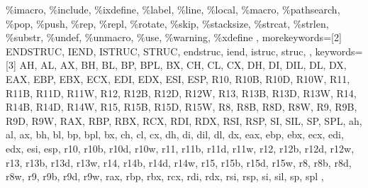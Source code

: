 {{\%imacro, \%include, \%ixdefine, \%label, \%line, \%local, \%macro,
\%pathsearch, \%pop, \%push, \%rep, \%repl, \%rotate, \%skip, \%stacksize,
\%strcat, \%strlen, \%substr, \%undef, \%unmacro, \%use, \%warning, \%xdefine
  },
  morekeywords=[2]{
ENDSTRUC, IEND, ISTRUC, STRUC,
endstruc, iend, istruc, struc,
  },
  keywords=[3]{
AH, AL, AX, BH, BL, BP, BPL, BX, CH, CL, CX, DH, DI, DIL, DL, DX, EAX, EBP, EBX,
ECX, EDI, EDX, ESI, ESP, R10, R10B, R10D, R10W, R11, R11B, R11D, R11W, R12,
R12B, R12D, R12W, R13, R13B, R13D, R13W, R14, R14B, R14D, R14W, R15, R15B, R15D,
R15W, R8, R8B, R8D, R8W, R9, R9B, R9D, R9W, RAX, RBP, RBX, RCX, RDI, RDX, RSI,
RSP, SI, SIL, SP, SPL,
ah, al, ax, bh, bl, bp, bpl, bx, ch, cl, cx, dh, di, dil, dl, dx, eax, ebp, ebx,
ecx, edi, edx, esi, esp, r10, r10b, r10d, r10w, r11, r11b, r11d, r11w, r12,
r12b, r12d, r12w, r13, r13b, r13d, r13w, r14, r14b, r14d, r14w, r15, r15b, r15d,
r15w, r8, r8b, r8d, r8w, r9, r9b, r9d, r9w, rax, rbp, rbx, rcx, rdi, rdx, rsi,
rsp, si, sil, sp, spl
  },
}


\usetikzlibrary{external}






